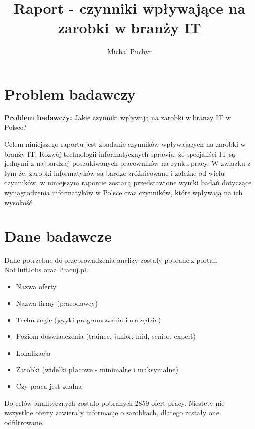 \documentclass{article}
\title{Raport - czynniki wpływające na zarobki w branży IT}
\author{Michał Puchyr}
\begin{document}


\section{Problem badawczy}

\textbf{Problem badawczy:} Jakie czynniki wpływają na zarobki w branży IT w Polsce?

Celem niniejszego raportu jest zbadanie czynników wpływających na zarobki w branży IT. Rozwój technologii informatycznych sprawia, że specjaliści IT
są jednymi z najbardziej poszukiwanych pracowników na rynku pracy. W związku z tym że, zarobki informatyków są bardzo zróżnicowane i zależne od wielu czynników,
w niniejszym raporcie zostaną przedstawione wyniki badań dotyczące wynagrodzenia informatyków w Polsce oraz czynników, które wpływają na ich wysokość.


\section{Dane badawcze}

Dane potrzebne do przeprowadzenia analizy zostały pobrane z portali NoFluffJobs oraz Pracuj.pl.

\begin{itemize}
    \item Nazwa oferty
    \item Nazwa firmy (pracodawcy)
    \item Technologie (języki programowania i narzędzia)
    \item Poziom doświadczenia (trainee, junior, mid, senior, expert)
    \item Lokalizacja
    \item Zarobki (widełki płacowe - minimalne i maksymalne)
    \item Czy praca jest zdalna
\end{itemize}

\bigskip

Do celów analitycznych zostało pobranych 2859 ofert pracy.
Niestety nie wszystkie oferty zawierały informacje o zarobkach, dlatego zostały one odfiltrowane.
\end{document}
